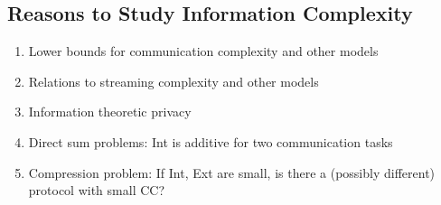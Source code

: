 \documentclass{article}
\begin{document}
\subsection{Reasons to Study Information Complexity}

\begin{enumerate}
    \item Lower bounds for communication complexity and other models
    \item Relations to streaming complexity and other models
    \item Information theoretic privacy 
    \item Direct sum problems: Int is additive for two communication tasks
    \item Compression problem: If Int, Ext are small, is there a (possibly different) protocol with small CC?
\end{enumerate}
\end{document}
